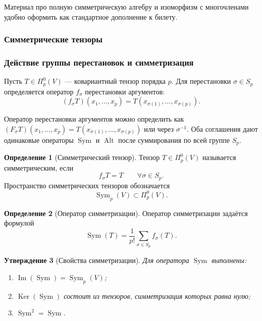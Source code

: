 \documentclass[12pt,a4paper]{article}
\theoremstyle{definition}
\newtheorem{definition}{Определение}[section]
\theoremstyle{plain}
\newtheorem{proposition}[definition]{Утверждение}
\theoremstyle{remark}
\newenvironment{planadd}{\begin{planbox}}{\end{planbox}}
\newenvironment{knowledgefix}{\begin{clarifybox}}{\end{clarifybox}}
\newcommand{\Ker}{\operatorname{Ker}}
\newcommand{\Imop}{\operatorname{Im}}
\newcommand{\Sym}{\operatorname{Sym}}
\newcommand{\Alt}{\operatorname{Alt}}
\begin{document}
\begin{planadd}

Материал про полную симметрическую алгебру и изоморфизм с многочленами удобно оформить как стандартное дополнение к билету.

\end{planadd}

\subsubsection{Симметрические тензоры}

\subsubsection*{Действие группы перестановок и симметризация}

Пусть $T\in\Pi^0_p(V)$ --- ковариантный тензор порядка $p$.
Для перестановки $\sigma\in S_p$ определяется оператор $f_\sigma$ перестановки аргументов:
\[
    (f_\sigma T)(x_1,\ldots,x_p)
    =
    T(x_{\sigma(1)},\ldots,x_{\sigma(p)}).
\]
\begin{knowledgefix}
Оператор перестановки аргументов можно определить как \((F_\sigma T)(x_1,
\ldots,x_p)=T(x_{\sigma(1)},\ldots,x_{\sigma(p)})\) или через \(\sigma^{-1}\). Оба соглашения дают одинаковые операторы \(\Sym\) и \(\Alt\) после суммирования по всей группе \(S_p\).
\end{knowledgefix}

\begin{definition}[Симметрический тензор]
Тензор $T\in\Pi^0_p(V)$ называется симметрическим, если
\[
    f_\sigma T=T
    \qquad
    \forall\sigma\in S_p.
\]
Пространство симметрических тензоров обозначается
\[
    \Sym_p(V)\subset \Pi^0_p(V).
\]
\end{definition}

\begin{definition}[Оператор симметризации]
Оператор симметризации задаётся формулой
\[
    \Sym(T)=\frac{1}{p!}\sum_{\sigma\in S_p} f_\sigma(T).
\]
\end{definition}

\begin{proposition}[Свойства симметризации]
Для оператора $\Sym$ выполнены:
\begin{enumerate}[label=\arabic*)]
    \item $\Imop(\Sym)=\Sym_p(V)$;
    \item $\Ker(\Sym)$ состоит из тензоров, симметризация которых равна нулю;
    \item $\Sym^2=\Sym$.
\end{enumerate}
\end{proposition}
\end{document}
